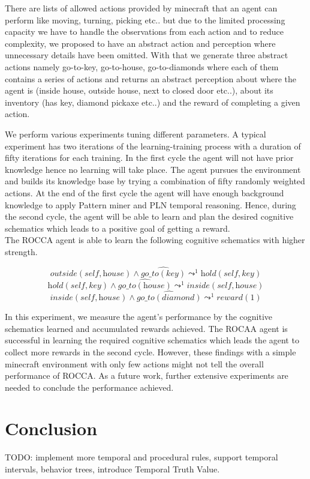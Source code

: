 \documentclass[runningheads]{llncs}
\newcommand{\MAnd}{\wedge}
\newcommand{\MPredImpl}{\leadsto}
\newcommand{\MDo}[1]{\widehat{#1}}
\begin{document}
There are lists of allowed actions provided by minecraft that an agent can perform like moving, turning, picking etc.. but due to the limited processing capacity we have to handle the observations from each action and to reduce complexity, we proposed to have an abstract action and perception where unnecessary details have been omitted. With that we generate three abstract actions namely go-to-key, go-to-house, go-to-diamonds where each of them contains a series of actions and returns an abstract perception about where the agent is (inside house, outside house, next to closed door etc..), about its inventory (has key, diamond pickaxe etc..) and the reward of completing a given action. \par
We perform various experiments tuning different parameters. A typical experiment has two iterations of the learning-training process with a duration of fifty iterations for each training. In the first cycle the agent will not have prior knowledge hence no learning will take place. The agent pursues the environment and builds its knowledge base by trying a combination of fifty randomly weighted actions. At the end of the first cycle the agent will have enough background knowledge to apply Pattern miner and PLN temporal reasoning. Hence, during the second cycle, the agent will be able to learn and plan the desired cognitive schematics which leads to a positive goal of getting a reward.\\
The ROCCA agent is able to learn the following cognitive schematics with higher strength.

$$\textit{outside}(\textit{self}, \textit{house}) \MAnd \MDo{\textit{go\_to}(\textit{key})} \MPredImpl^1 \textit{hold}(\textit{self}, \textit{key})$$
$$\textit{hold}(\textit{self}, \textit{key}) \MAnd \MDo{\textit{go\_to}(\textit{house})} \MPredImpl^1 \textit{inside}(\textit{self}, \textit{house})$$
$$\textit{inside}(\textit{self}, \textit{house}) \MAnd \MDo{\textit{go\_to}(\textit{diamond})} \MPredImpl^1 \textit{reward}(1)$$

In this experiment, we measure the agent's performance by the cognitive schematics learned and accumulated rewards achieved. The ROCAA agent is successful in learning the required cognitive schematics which leads the agent to collect more rewards in the second cycle. However, these findings with a simple minecraft environment with only few actions might not tell the overall performance of ROCCA. As a future work, further extensive experiments are needed to conclude the performance achieved.

\section{Conclusion}

TODO: implement more temporal and procedural rules, support temporal
intervals, behavior trees, introduce Temporal Truth Value.

%
%
 
\end{document}
